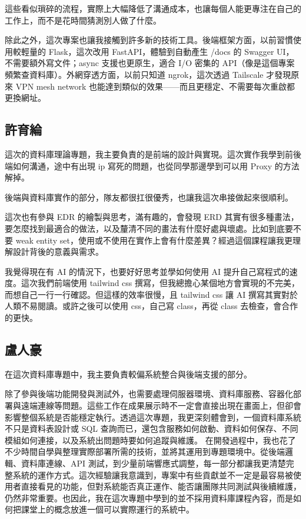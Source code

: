 \documentclass[UTF8, a4paper, 12pt, fontset=none]{ctexart}
\begin{document}
這些看似瑣碎的流程，實際上大幅降低了溝通成本，也讓每個人能更專注在自己的工作上，而不是花時間猜測別人做了什麼。

除此之外，這次專案也讓我接觸到許多新的技術工具。後端框架方面，以前習慣使用較輕量的 Flask，這次改用 FastAPI，體驗到自動產生 /docs 的 Swagger UI，不需要額外寫文件；async 支援也更原生，適合 I/O 密集的 API（像是這個專案頻繁查資料庫）。外網穿透方面，以前只知道 ngrok，這次透過 Tailscale 才發現原來 VPN mesh network 也能達到類似的效果——而且更穩定、不需要每次重啟都更換網址。

\subsection*{許育綸}
這次的資料庫理論專題，我主要負責的是前端的設計與實現。這次實作我學到前後端如何溝通，途中有出現  ip 寫死的問題，也從同學那邊學到可以用 Proxy 的方法解掉。

後端與資料庫實作的部分，隊友都很扛很優秀，也讓我這次串接做起來很順利。

這次也有參與 EDR 的繪製與思考，滿有趣的，會發現 ERD 其實有很多種畫法，要怎麼找到最適合的做法，以及釐清不同的畫法有什麼好處與壞處。比如到底要不要 weak entity set，使用或不使用在實作上會有什麼差異？經過這個課程讓我更理解設計背後的意義與需求。

我覺得現在有 AI 的情況下，也要好好思考並學如何使用 AI 提升自己寫程式的速度。這次我們前端使用 tailwind css 撰寫，但我總擔心某個地方會實現的不完美，而想自己一行一行確認。但這樣的效率很慢，且 tailwind css 讓 AI 撰寫其實對於人類不易閱讀。或許之後可以使用 css，自己寫 class，再從 class 去檢查，會合作的更快。

\subsection*{盧人豪}
在這次資料庫專題中，我主要負責較偏系統整合與後端支援的部分。

除了參與後端功能開發與測試外，也需要處理伺服器環境、資料庫服務、容器化部署與遠端連線等問題。這些工作在成果展示時不一定會直接出現在畫面上，但卻會影響整個系統是否能穩定執行。透過這次專題，我更深刻體會到，一個資料庫系統不只是資料表設計或 SQL 查詢而已，還包含服務如何啟動、資料如何保存、不同模組如何連接，以及系統出問題時要如何追蹤與維護。
在開發過程中，我也花了不少時間自學與整理實際部署所需的技術，並將其運用到專題環境中。從後端邏輯、資料庫連線、API 測試，到少量前端響應式調整，每一部分都讓我更清楚完整系統的運作方式。這次經驗讓我意識到，專案中有些貢獻並不一定是最容易被使用者直接看見的功能，但對系統能否真正運作、能否讓團隊共同測試與後續維護，仍然非常重要。也因此，我在這次專題中學到的並不採用資料庫課程內容，而是如何把課堂上的概念放進一個可以實際運行的系統中。
\appendix


\end{document}
